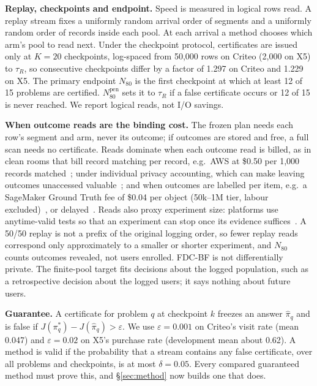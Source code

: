 \documentclass[sigconf,anonymous,review]{acmart}
\newcommand{\eps}{\varepsilon}
\newcommand{\Npen}{N_{80}^{\text{pen}}}
\begin{document}
\textbf{Replay, checkpoints and endpoint.} Speed is measured in logical rows read. A replay stream fixes a uniformly random arrival order of segments and a uniformly random order of records inside each pool. At each arrival a method chooses which arm's pool to read next. Under the checkpoint protocol, certificates are issued only at $K = 20$ checkpoints, log-spaced from 50,000 rows on Criteo (2,000 on X5) to $\tau_R$, so consecutive checkpoints differ by a factor of 1.297 on Criteo and 1.229 on X5. The primary endpoint $N_{80}$ is the first checkpoint at which at least 12 of 15 problems are certified. $\Npen$ sets it to $\tau_R$ if a false certificate occurs or 12 of 15 is never reached. We report logical reads, not I/O savings.

\textbf{When outcome reads are the binding cost.} The frozen plan needs each row's segment and arm, never its outcome; if outcomes are stored and free, a full scan needs no certificate. Reads dominate when each outcome read is billed, as in clean rooms that bill record matching per record, e.g.\ AWS at \$0.50 per 1,000 records matched~\citep{awscleanrooms2026pricing}; under individual privacy accounting, which can make leaving outcomes unaccessed valuable~\citep{ebadi2015personal,feldman2021individual}; and when outcomes are labelled per item, e.g.\ a SageMaker Ground Truth fee of \$0.04 per object (50k--1M tier, labour excluded)~\citep{awssagemaker2026pricing}, or delayed~\citep{chapelle2014modeling}. Reads also proxy experiment size: platforms use anytime-valid tests so that an experiment can stop once its evidence suffices~\citep{johari2017peeking,lindon2026anytime,schultzberg2023sequential}. A 50/50 replay is not a prefix of the original logging order, so fewer replay reads correspond only approximately to a smaller or shorter experiment, and $N_{80}$ counts outcomes revealed, not users enrolled. FDC-BF is not differentially private. The finite-pool target fits decisions about the logged population, such as a retrospective decision about the logged users; it says nothing about future users.

\textbf{Guarantee.} A certificate for problem $q$ at checkpoint $k$ freezes an answer $\hat\pi_q$ and is false if $J(\pi^*_q) - J(\hat\pi_q) > \eps$. We use $\eps = 0.001$ on Criteo's visit rate (mean 0.047) and $\eps = 0.02$ on X5's purchase rate (development mean about 0.62). A method is valid if the probability that a stream contains any false certificate, over all problems and checkpoints, is at most $\delta = 0.05$. Every compared guaranteed method must prove this, and \S\ref{sec:method} now builds one that does.
\end{document}
